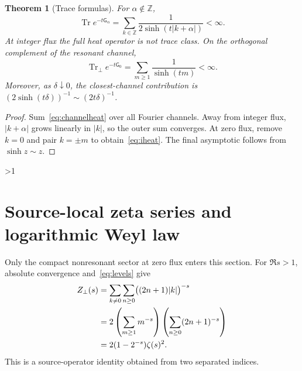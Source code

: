 \documentclass[10pt]{article}
\providecommand{\CRevisionRound}{2}
\newtheorem{theorem}{Theorem}
\newcommand{\Z}{\mathbb Z}
\newcommand{\G}{\mathsf G}
\begin{document}
\begin{theorem}[Trace formulas]\label{thm:heat}
For $\alpha\notin\Z$,
\begin{equation}\label{eq:heat}
 \operatorname{Tr}e^{-t\G_\alpha}
 =\sum_{k\in\Z}\frac1{2\sinh(t|k+\alpha|)}<\infty.
\end{equation}
At integer flux the full heat operator is not trace class.  On the
orthogonal complement of the resonant channel,
\begin{equation}\label{eq:iheat}
 \operatorname{Tr}_{\perp}e^{-t\G_0}
 =\sum_{m\geq1}\frac1{\sinh(tm)}<\infty.
\end{equation}
Moreover, as $\delta\downarrow0$, the closest-channel contribution is
$(2\sinh(t\delta))^{-1}\sim(2t\delta)^{-1}$.
\end{theorem}
\begin{proof}
Sum~\eqref{eq:channelheat} over all Fourier channels.  Away from integer
flux, $|k+\alpha|$ grows linearly in $|k|$, so the outer sum converges.
At zero flux, remove $k=0$ and pair $k=\pm m$ to obtain~\eqref{eq:iheat}.
The final asymptotic follows from $\sinh z\sim z$.
\end{proof}
\fi

\ifnum\CRevisionRound>1
\section{Source-local zeta series and logarithmic Weyl law}
Only the compact nonresonant sector at zero flux enters this section.  For
$\Re s>1$, absolute convergence and~\eqref{eq:levels} give
\begin{align}
 Z_\perp(s)
 &=\sum_{k\ne0}\sum_{n\geq0}
   \bigl((2n+1)|k|\bigr)^{-s}\notag\\
 &=2\left(\sum_{m\geq1}m^{-s}\right)
   \left(\sum_{n\geq0}(2n+1)^{-s}\right)\notag\\
 &=2(1-2^{-s})\zeta(s)^2.\label{eq:zeta}
\end{align}
This is a source-operator identity obtained from two separated indices.
\end{document}
